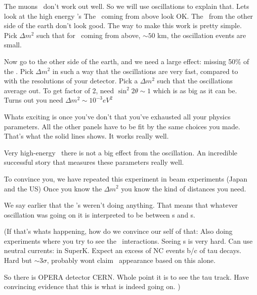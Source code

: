 {The muons \nus\ don't work out well. 
So we will use oscillations to explain that.
Lets look at the high energy \numu's
The \nus\ coming from above look OK. 
The \nus\ from the other side of the earth don't look good. 
The way to make this work is pretty simple. 
Pick $\Delta m^2$ such that for \nus\ coming from above, $\sim50$ km, the oscillation events are small. 

Now go to the other side of the earth, and we need a large effect: missing 50\% of the \nus.
Pick $\Delta m^2$ in such a way that the oscillations are very fast, compared to with the resolutions of your detector. 
Pick a $\Delta m^2$ such that the oscillations average out.
To get factor of 2, need $\sin^2 2\theta \sim 1 $ which is as big as it can be. 
Turns out you need $\Delta m^2 \sim 10^{-3} eV^2$


Whats exciting is once you've don't that you've exhausted all your physics parameters.  
All the other panels have to be fit by the same choices you made. 
That's what the solid lines shows. 
It works really well.

Very high-energy \nus\ there is not a big effect from the oscillation.
An incredible successful story that measures these parameters really well. 

To convince you, we have repeated this experiment in beam experiments (Japan and the US) 
Once you know the $\Delta m^2$ you know the kind of distances you need.

We say earlier that the \nue's weren't doing anything. 
That means that whatever oscillation was going on it is interpreted to be between \numu s  and \nutau s.

(If that's whats happening, how do we convince our self of that:
Also doing experiments where you try to see the \nutau\ interactions. 
Seeing \nutau s is very hard. 
Can use neutral currents: in SuperK. 
Expect an excess of NC events b/c of tau decays. 
Hard but $\sim3\sigma$, probably wont claim \nutau\ appearance based on this alone. 

So there is OPERA detector CERN. 
Whole point it is to see the tau track.  
Have convincing evidence that this is what is indeed going on.
)

}



